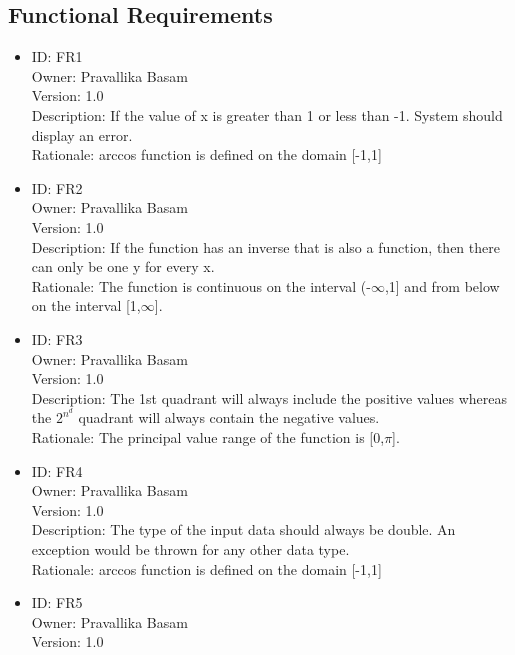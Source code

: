 \documentclass{article}
\begin{document}
    \subsection{Functional Requirements}
    \begin{itemize}
        \item ID: FR1\\
        Owner: Pravallika Basam\\
        Version: 1.0\\
        Description: If the value of x is greater than 1 or less than -1. System should display an error. \\
        Rationale: arccos function is defined on the domain [-1,1] \\
        \item ID: FR2\\
        Owner: Pravallika Basam\\
        Version: 1.0\\
        Description: If the function has an inverse that is also a function, then there can only be one y for every x.\\
        Rationale: The function is continuous on the interval (-$\infty$,1] and from below on the interval [1,$\infty$].\\
        \item ID: FR3\\
        Owner: Pravallika Basam\\
        Version: 1.0\\
        Description: The 1st quadrant will always include the positive values whereas the {$2^n^d$} quadrant will always contain the negative values.\\
        Rationale: The principal value range of the function is [0,$\pi$].\\
        \item ID: FR4\\
        Owner: Pravallika Basam\\
        Version: 1.0\\
        Description: The type of the input data should always be double. An exception would be thrown for any other data type.\\
        Rationale: arccos function is defined on the domain [-1,1]\\
        \item ID: FR5\\
        Owner: Pravallika Basam\\
        Version: 1.0\\

\end{itemize}
\end{document}
